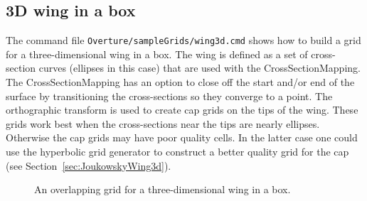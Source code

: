 \documentclass[xcolor=rgb,svgnames,dvipsnames]{article}
\newcommand{\figures}{../fig}
\begin{document}
\subsection{3D wing in a box}\label{sec:3dWingInABox}

The command file {\tt Overture/sampleGrids/wing3d.cmd} shows how to build a grid 
for a three-dimensional wing in a box. The wing is defined as a set of cross-section curves (ellipses in
this case)
that are used with the CrossSectionMapping. The CrossSectionMapping has an option to 
close off the start and/or end of the surface by transitioning the cross-sections
so they converge to a point. The orthographic transform is used to create cap grids on
the tips of the wing. These grids work best when the cross-sections near the tips are
nearly ellipses. Otherwise the cap grids may have poor quality cells. In the latter case
one could use the hyperbolic grid generator to construct a better quality grid for
the cap (see Section~\ref{sec:JoukowskyWing3d}). 

{
\newcommand{\figWidthd}{7cm}
\newcommand{\trimfig}[2]{\trimPlot{#1}{#2}{.0}{.0}{.15}{.15}}
\begin{figure}[hbt]
\begin{center}
\end{center}
\caption{An overlapping grid for a three-dimensional wing in a box. } \label{fig:wing3d}
\end{figure}
}


\end{document}
